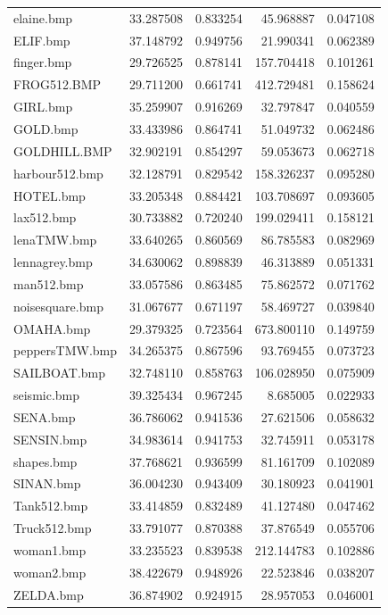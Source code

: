 \documentclass{article}
\begin{document}
\begin{table}[h]
\begin{tabular}{@{}lrrrr@{}}
    elaine.bmp         & 33.287508 & 0.833254 & 45.968887  & 0.047108 \\
    ELIF.bmp           & 37.148792 & 0.949756 & 21.990341  & 0.062389 \\
    finger.bmp         & 29.726525 & 0.878141 & 157.704418 & 0.101261 \\
    FROG512.BMP        & 29.711200 & 0.661741 & 412.729481 & 0.158624 \\
    GIRL.bmp           & 35.259907 & 0.916269 & 32.797847  & 0.040559 \\
    GOLD.bmp           & 33.433986 & 0.864741 & 51.049732  & 0.062486 \\
    GOLDHILL.BMP       & 32.902191 & 0.854297 & 59.053673  & 0.062718 \\
    harbour512.bmp     & 32.128791 & 0.829542 & 158.326237 & 0.095280 \\
    HOTEL.bmp          & 33.205348 & 0.884421 & 103.708697 & 0.093605 \\
    lax512.bmp         & 30.733882 & 0.720240 & 199.029411 & 0.158121 \\
    lenaTMW.bmp        & 33.640265 & 0.860569 & 86.785583  & 0.082969 \\
    lennagrey.bmp      & 34.630062 & 0.898839 & 46.313889  & 0.051331 \\
    man512.bmp         & 33.057586 & 0.863485 & 75.862572  & 0.071762 \\
    noisesquare.bmp    & 31.067677 & 0.671197 & 58.469727  & 0.039840 \\
    OMAHA.bmp          & 29.379325 & 0.723564 & 673.800110 & 0.149759 \\
    peppersTMW.bmp     & 34.265375 & 0.867596 & 93.769455  & 0.073723 \\
    SAILBOAT.bmp       & 32.748110 & 0.858763 & 106.028950 & 0.075909 \\
    seismic.bmp        & 39.325434 & 0.967245 & 8.685005   & 0.022933 \\
    SENA.bmp           & 36.786062 & 0.941536 & 27.621506  & 0.058632 \\
    SENSIN.bmp         & 34.983614 & 0.941753 & 32.745911  & 0.053178 \\
    shapes.bmp         & 37.768621 & 0.936599 & 81.161709  & 0.102089 \\
    SINAN.bmp          & 36.004230 & 0.943409 & 30.180923  & 0.041901 \\
    Tank512.bmp        & 33.414859 & 0.832489 & 41.127480  & 0.047462 \\
    Truck512.bmp       & 33.791077 & 0.870388 & 37.876549  & 0.055706 \\
    woman1.bmp         & 33.235523 & 0.839538 & 212.144783 & 0.102886 \\
    woman2.bmp         & 38.422679 & 0.948926 & 22.523846  & 0.038207 \\
    ZELDA.bmp          & 36.874902 & 0.924915 & 28.957053  & 0.046001 \\
    \bottomrule

  \end{tabular}
\end{table}
\end{document}
